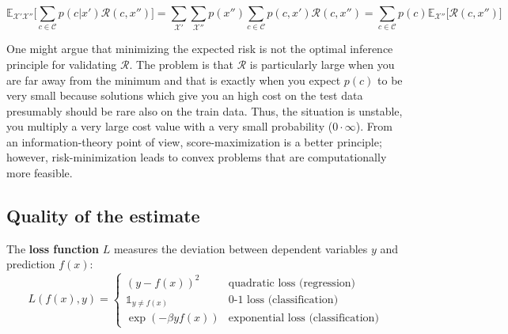 \documentclass[twoside]{article}
\begin{document}
$$\mathbb{E}_{\mathcal{X}' \mathcal{X}''}\Big[ \sum_{c \in \mathcal{C}} p(c|x')\mathcal{R}(c,x'') \Big] = \sum_{\mathcal{X}'}\sum_{\mathcal{X}''} p(x'') \sum_{c \in \mathcal{C}} p(c,x')\mathcal{R}(c,x'')= \sum_{c \in \mathcal{C}} p(c) \mathbb{E}_{\mathcal{X}''}\big[ \mathcal{R}(c,x'') \big]$$

One might argue that minimizing the expected risk is not the optimal inference principle for validating $\mathcal{R}$. The problem is that $\mathcal{R}$ is particularly large when you are far away from the minimum and that is exactly when you expect $p(c)$ to be very small because solutions which give you an high cost on the test data presumably should be rare also on the train data. Thus, the situation is  unstable, you multiply a very large cost value with a very small probability ($0 \cdot \infty$). From an information-theory point of view, score-maximization is a better principle; however, risk-minimization leads to convex problems that are computationally more feasible.

\subsection{Quality of the estimate}

The \textbf{loss function} $L$ measures the deviation between dependent variables $y$ and  prediction $f(x)$:
\begin{equation*}
  L(f(x),y) =
    \begin{cases}
      (y - f(x))^2 & \text{quadratic loss (regression)}\\
      \mathds{1}_{y \neq f(x)} & \text{0-1 loss (classification)}\\
      \exp{(-\beta y f(x))} & \text{exponential loss (classification)}
    \end{cases}       
\end{equation*}
\end{document}
